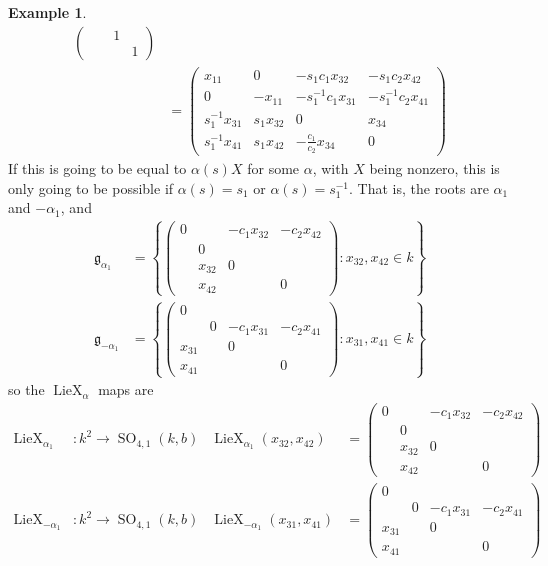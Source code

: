 \documentclass[12pt]{article}
\theoremstyle{definition}
\newtheorem{example}[theorem]{Example}
\numberwithin{theorem}{subsection}
\newcommand{\lb}{\left\{}
\newcommand{\rb}{\right\}}
\newcommand{\inv}{^{-1}}
\newcommand{\frakg}{\mathfrak{g}}
\DeclareMathOperator{\SO}{SO}
\DeclareMathOperator{\LieX}{LieX}
\begin{document}
\begin{example}
\begin{align*}
\begin{pmatrix}
		&& 1 \\
		&&& 1
	\end{pmatrix}  \\
	&=
	\begin{pmatrix}
		x_{11} & 0 & - s_1 c_1 x_{32}  & - s_1 c_2 x_{42} \\
		0 & - x_{11} & - s_1 \inv c_1 x_{31} & - s_1 \inv c_2 x_{41} \\
		s_1 \inv x_{31} & s_1 x_{32} & 0 & x_{34} \\
		s_1 \inv x_{41} & s_1 x_{42} & - \frac{c_1}{c_2} x_{34} & 0
	\end{pmatrix}
\end{align*}
If this is going to be equal to $\alpha(s) X$ for some $\alpha$, with $X$ being nonzero, this is only going to be possible if $\alpha(s) = s_1$ or $\alpha(s) = s_1 \inv$. That is, the roots are $\alpha_1$ and $-\alpha_1$, and
\begin{align*}
	\frakg_{\alpha_1} &= \lb
	\begin{pmatrix}
		0 && - c_1 x_{32}  & - c_2 x_{42} \\
		& 0 &  \\
		& x_{32} & 0 &  \\
		& x_{42} && 0
	\end{pmatrix}: x_{32}, x_{42} \in k \rb \\
	\frakg_{-\alpha_1} &= 
	\lb
	\begin{pmatrix}
		0   \\
		& 0 & - c_1 x_{31} & - c_2 x_{41} \\
		x_{31} & & 0 & \\
		x_{41} & & & 0
	\end{pmatrix}
	: x_{31}, x_{41} \in k
	\rb
\end{align*}
so the $\LieX_\alpha$ maps are
\begin{align*}
	\LieX_{\alpha_1}& :k^2 \to \SO_{4,1}(k,b) & \LieX_{\alpha_1}(x_{32}, x_{42}) &=
	\begin{pmatrix}
		0 && - c_1 x_{32}  & - c_2 x_{42} \\
		& 0 &  \\
		& x_{32} & 0 &  \\
		& x_{42} && 0
	\end{pmatrix} \\
	\LieX_{-\alpha_1}&:k^2 \to \SO_{4,1}(k,b) & \LieX_{-\alpha_1}(x_{31}, x_{41}) &=
	\begin{pmatrix}
		0   \\
		& 0 & - c_1 x_{31} & - c_2 x_{41} \\
		x_{31} & & 0 & \\
		x_{41} & & & 0
	\end{pmatrix}
\end{align*}
\end{example}
\end{document}
